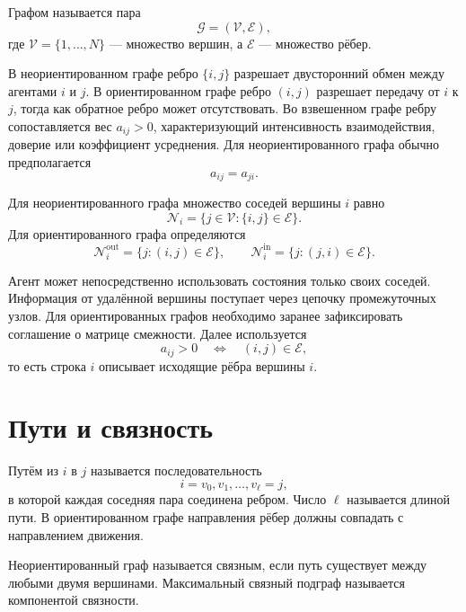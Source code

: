 \begin{definition}[Граф]
Графом называется пара
\[
    \mathcal G=(\mathcal V,\mathcal E),
\]
где \(\mathcal V=\{1,\ldots,N\}\) --- множество вершин, а
\(\mathcal E\) --- множество рёбер.
\end{definition}

В неориентированном графе ребро \(\{i,j\}\) разрешает двусторонний
обмен между агентами \(i\) и \(j\). В ориентированном графе ребро
\((i,j)\) разрешает передачу от \(i\) к \(j\), тогда как обратное
ребро может отсутствовать. Во взвешенном графе ребру сопоставляется
вес \(a_{ij}>0\), характеризующий интенсивность взаимодействия,
доверие или коэффициент усреднения. Для неориентированного графа
обычно предполагается
\[
    a_{ij}=a_{ji}.
\]

\begin{definition}[Соседи]
Для неориентированного графа множество соседей вершины \(i\) равно
\[
    \mathcal N_i
    =
    \{j\in\mathcal V:\{i,j\}\in\mathcal E\}.
\]
Для ориентированного графа определяются
\[
    \mathcal N_i^{\mathrm{out}}
    =
    \{j:(i,j)\in\mathcal E\},
    \qquad
    \mathcal N_i^{\mathrm{in}}
    =
    \{j:(j,i)\in\mathcal E\}.
\]
\end{definition}

Агент может непосредственно использовать состояния только своих
соседей. Информация от удалённой вершины поступает через цепочку
промежуточных узлов. Для ориентированных графов необходимо заранее
зафиксировать соглашение о матрице смежности. Далее используется
\[
    a_{ij}>0
    \quad\Longleftrightarrow\quad
    (i,j)\in\mathcal E,
\]
то есть строка \(i\) описывает исходящие рёбра вершины \(i\).

\section{Пути и связность}

\begin{definition}[Путь]
Путём из \(i\) в \(j\) называется последовательность
\[
    i=v_0,v_1,\ldots,v_\ell=j,
\]
в которой каждая соседняя пара соединена ребром. Число \(\ell\)
называется длиной пути. В ориентированном графе направления рёбер
должны совпадать с направлением движения.
\end{definition}

\begin{definition}[Связность]
Неориентированный граф называется связным, если путь существует между
любыми двумя вершинами. Максимальный связный подграф называется
компонентой связности.
\end{definition}

